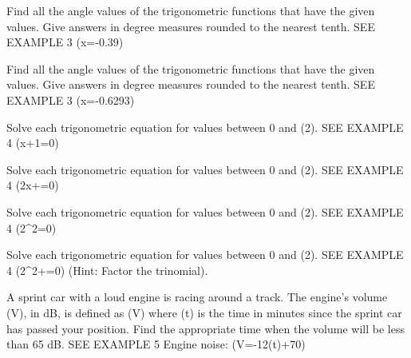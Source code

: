 \documentclass{article}
\newenvironment{practice}[2]{}{}        %
\newcommand{\answer}[1]{}               %
\newcommand{\placeholder}[2]{}          %
\newcommand{\te}[1]{}                   %
\begin{document}
\begin{practice}{26}{1}
Find all the angle values of the trigonometric functions that have the given values. Give answers in degree measures rounded to the nearest tenth. SEE EXAMPLE 3
(\sin x=-0.39)
\answer{(-23.0°+(360°)k), (-157.0°+(360°)k), where k is an integer}
\end{practice}
\begin{practice}{27}{1}
Find all the angle values of the trigonometric functions that have the given values. Give answers in degree measures rounded to the nearest tenth. SEE EXAMPLE 3
(\tan x=-0.6293)
\answer{(-32.2°+(180°)k), where k is an integer}
\end{practice}
\begin{practice}{28}{1}
Solve each trigonometric equation for values between 0 and (2\pi). SEE EXAMPLE 4
(\tan x+1=0)
\answer{(\frac{5\pi}6,\frac{11\pi}6)}
\end{practice}
\begin{practice}{29}{1}
Solve each trigonometric equation for values between 0 and (2\pi). SEE EXAMPLE 4
(2\sin x+=0)
\answer{(\frac{4\pi}3,\frac{5\pi}3)}
\end{practice}
\begin{practice}{30}{1}
Solve each trigonometric equation for values between 0 and (2\pi). SEE EXAMPLE 4
(2\cos^2=0)
\answer{(\frac\pi4,\frac{3\pi}4,\frac{5\pi}4,\frac{7\pi}4)}
\end{practice}
\begin{practice}{31}{1}
Solve each trigonometric equation for values between 0 and (2\pi). SEE EXAMPLE 4
(2\sin^2\theta+\sin{}=0) (Hint: Factor the trinomial).
\answer{(\frac\pi6,\frac{5\pi}6,\frac{3\pi}2)}
\end{practice}
\begin{practice}{32}{2}
A sprint car with a loud engine is racing around a track. The engine's volume (V), in dB, is defined as (V) where (t) is the time in minutes since the sprint car has passed your position. Find the appropriate time when the volume will be less than 65 dB. SEE EXAMPLE 5
Engine noise: (V=-12\sin(t)+70)
\placeholder{illustration}{Orange sprintcar12 racingright ontrack,handforegroundholds yellowandblacknoisemeter showing65dB;engine-noiseformula inwhitebox.}
\answer{about 1.03 minutes}
\te{Printed answer is approximately the first 65dB crossing; likely the requested less-than interval starts just after it.}
\end{practice}
\end{document}

